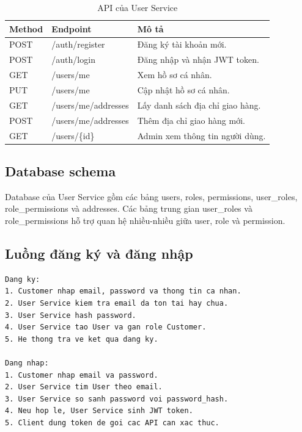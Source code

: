 \documentclass[../main.tex]{subfiles}
\begin{document}
\begin{table}[H]
    \centering
    \caption{API của User Service}
    \label{tab:chapter2-user-api}
    \begin{tabular}{|p{}|p{}|p{}|}
        \hline
        \rowcolor{primary!35}
        \textbf{Method} & \textbf{Endpoint} & \textbf{Mô tả} \\
        \hline
        POST & /auth/register & Đăng ký tài khoản mới. \\
        \hline
        POST & /auth/login & Đăng nhập và nhận JWT token. \\
        \hline
        GET & /users/me & Xem hồ sơ cá nhân. \\
        \hline
        PUT & /users/me & Cập nhật hồ sơ cá nhân. \\
        \hline
        GET & /users/me/addresses & Lấy danh sách địa chỉ giao hàng. \\
        \hline
        POST & /users/me/addresses & Thêm địa chỉ giao hàng mới. \\
        \hline
        GET & /users/\{id\} & Admin xem thông tin người dùng. \\
        \hline
    \end{tabular}
\end{table}

\subsection{Database schema}
\label{subsection:2.4.5}

Database của User Service gồm các bảng users, roles, permissions, user\_roles, role\_permissions và addresses. Các bảng trung gian user\_roles và role\_permissions hỗ trợ quan hệ nhiều-nhiều giữa user, role và permission.

\subsection{Luồng đăng ký và đăng nhập}
\label{subsection:2.4.6}

\begin{lstlisting}[caption={Luồng đăng ký và đăng nhập}, label={lst:chapter2-auth-flow}]
Dang ky:
1. Customer nhap email, password va thong tin ca nhan.
2. User Service kiem tra email da ton tai hay chua.
3. User Service hash password.
4. User Service tao User va gan role Customer.
5. He thong tra ve ket qua dang ky.

Dang nhap:
1. Customer nhap email va password.
2. User Service tim User theo email.
3. User Service so sanh password voi password_hash.
4. Neu hop le, User Service sinh JWT token.
5. Client dung token de goi cac API can xac thuc.
\end{lstlisting}
\end{document}

